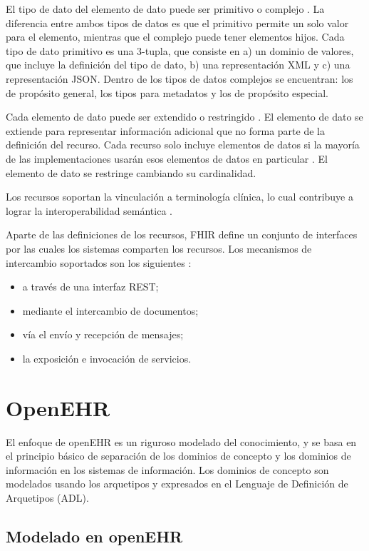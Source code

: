 El tipo de dato del elemento de dato puede ser primitivo o complejo \cite{FHIRDataTypes}. La diferencia entre ambos tipos de datos es que el primitivo permite un solo valor para el elemento,  mientras que el complejo puede tener elementos hijos. Cada tipo de dato primitivo es una 3-tupla, que consiste en a) un dominio de valores, que incluye la definición del tipo de dato, b) una representación XML y c) una representación JSON. Dentro de los tipos de datos complejos se encuentran: los de propósito general, los tipos para metadatos y los de propósito especial.

Cada elemento de dato puede ser extendido o restringido \cite{FHIRProfiling}. El elemento de dato se extiende para representar información adicional que no forma parte de la definición del recurso\cite{FHIRExtensibility}. Cada recurso solo incluye elementos de datos si la mayoría de las implementaciones usarán esos elementos de datos en particular \cite{FHIRArchitecture}. El elemento de dato se restringe cambiando su cardinalidad.

Los recursos soportan la vinculación a terminología clínica, lo cual contribuye a lograr la interoperabilidad semántica \cite{FHIRArchitecture}.

Aparte de las definiciones de los recursos, FHIR define un conjunto de interfaces por las cuales los sistemas comparten los recursos. Los mecanismos de intercambio soportados son los siguientes \cite{FHIRClinician}:
\begin{itemize}
  \item a través de una interfaz REST;
  \item mediante el intercambio de documentos;
  \item vía el envío y recepción de mensajes;
  \item la exposición e invocación de servicios.
\end{itemize}

\section{OpenEHR}

El enfoque de openEHR es un riguroso modelado del conocimiento, y se basa en el principio básico de separación de los dominios de concepto y los dominios de información en los sistemas de información. Los dominios de concepto son modelados usando los arquetipos y expresados en el Lenguaje de Definición de Arquetipos (ADL).

\subsection{Modelado en openEHR}


